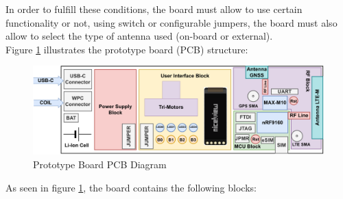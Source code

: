 \documentclass[report.tex]{subfiles}
\begin{document}
In order to fulfill these conditions, the board must allow to use certain functionality or not, using switch or configurable jumpers, the board must also allow to select the type of antenna used (on-board or external).\\

Figure \ref{fig:board_struct} illustrates the prototype board (PCB) structure:

\begin{figure}[H]
	\centering
	\includegraphics[width=1\textwidth]{Include/Figure/Hardware/board_struct.pdf}
	\caption{Prototype Board PCB Diagram}
	\label{fig:board_struct}
\end{figure}
As seen in figure \ref{fig:board_struct}, the board contains the following blocks:
\end{document}

